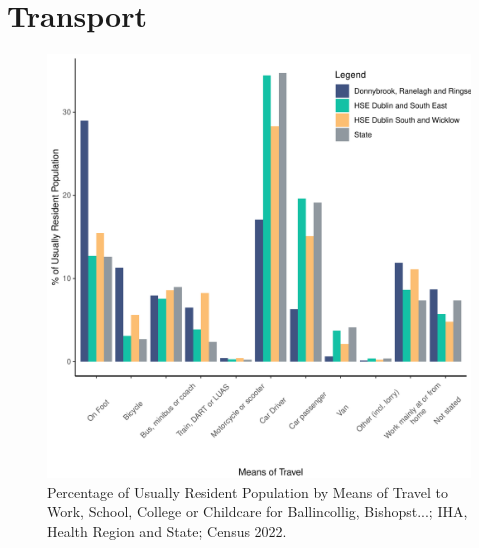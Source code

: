 \documentclass{article}
\begin{document}
\section{Transport}\label{sect:Trans}
\begin{figure}[H]
	\centering
	\includegraphics[width = 120mm]{../figures/TravelED.pdf}
	\caption{Percentage of Usually Resident Population by Means of Travel to Work, School, College or Childcare for Ballincollig, Bishopst...; IHA, Health Region and State; Census 2022.}
	\label{fig:vbnv}
	\end{figure}
\end{document}

